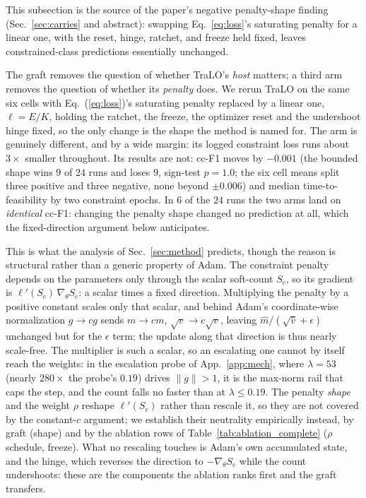 \documentclass[10pt]{article}
\begin{document}
This subsection is the source of the paper's negative penalty-shape
finding (Sec.~\ref{sec:carries} and abstract): swapping
Eq.~\eqref{eq:loss}'s saturating penalty for a linear one, with the
reset, hinge, ratchet, and freeze held fixed, leaves constrained-class
predictions essentially unchanged.

The graft removes the question of whether TraLO's \emph{host} matters; a
third arm removes the question of whether its \emph{penalty} does. We
rerun TraLO on the same six cells with Eq.~(\ref{eq:loss})'s saturating
penalty replaced by a linear one, $\ell = E/K$, holding the ratchet, the
freeze, the optimizer reset and the undershoot hinge fixed, so the only
change is the shape the method is named for. The arm is genuinely
different, and by a wide margin: its logged constraint loss runs about
$3\times$ smaller throughout. Its results are not: cc-F1 moves by
$-0.001$ (the bounded shape wins $9$ of $24$ runs and loses $9$,
sign-test $p{=}1.0$; the six cell means split three positive and three
negative, none beyond $\pm0.006$) and median time-to-feasibility by two
constraint epochs. In $6$ of the $24$ runs the two arms land on
\emph{identical} cc-F1: changing the penalty shape changed no
prediction at all, which the fixed-direction argument below anticipates.

This is what the analysis of Sec.~\ref{sec:method} predicts, though the
reason is structural rather than a generic property of Adam. The
constraint penalty depends on the parameters only through the scalar
soft-count $S_c$, so its gradient is $\ell'(S_c)\,\nabla_\theta S_c$: a
scalar times a fixed direction. Multiplying the penalty by a positive
constant scales only that scalar, and behind Adam's coordinate-wise
normalization $g\!\to\!cg$ sends $m\!\to\!cm$, $\sqrt{v}\!\to\!c\sqrt{v}$,
leaving $\hat m/(\sqrt{\hat v}+\epsilon)$ unchanged but for the
$\epsilon$ term; the update along that direction is thus nearly
scale-free. The multiplier is such a scalar, so an escalating one
cannot by itself reach the weights: in the escalation probe of
App.~\ref{app:mech}, where $\lambda{=}53$ (nearly $280\times$ the
probe's $0.19$) drives $\|g\|{>}1$, it is the max-norm rail that caps
the step, and the count falls no faster than at $\lambda\!\le\!0.19$.
The penalty \emph{shape} and the weight $\rho$ reshape $\ell'(S_c)$
rather than rescale it, so they are not covered by the constant-$c$
argument; we establish their neutrality empirically instead, by graft
(shape) and by the ablation rows of Table~\ref{tab:ablation_complete}
($\rho$ schedule, freeze). What no rescaling touches is Adam's own
accumulated state, and the hinge, which reverses the direction to
$-\nabla_\theta S_c$ while the count undershoots: these are the
components the ablation ranks first and the graft transfers.
\end{document}
